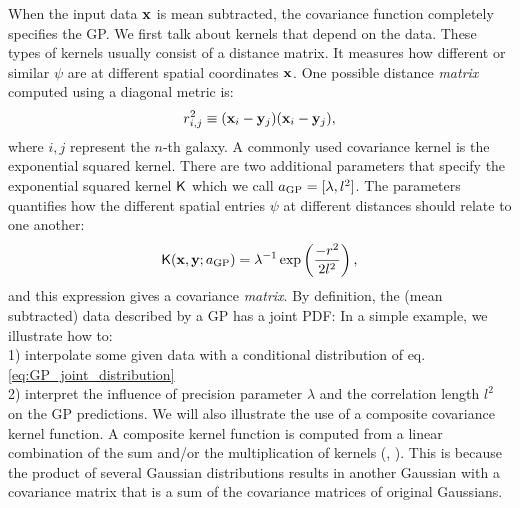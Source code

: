 When the input data $\mathbf{x}$ is mean subtracted, the covariance function  
completely specifies the GP. 
We first talk about kernels that depend on the data. These types of kernels 
usually consist of a distance matrix. It measures  
how different or similar $\psi$ are at different spatial coordinates $\mathbf{x}$. 
One possible distance {\it matrix} computed using a diagonal metric is: 
\begin{equation}
	r_{i, j}^2 \equiv (\mathbf{x}_i - \mathbf{y}_j) (\mathbf{x}_i - \mathbf{y}_j), 
	\label{eq:distance}
\end{equation}
where $i, j$ represent the $n$-th galaxy.
A commonly used covariance kernel is the exponential squared kernel. There are two
additional parameters that specify the exponential squared kernel $\mathsf{K}$ 
which we call $a_{\rm GP} = [\lambda, l^2]$. The parameters quantifies how the
different spatial entries $\psi$ at different distances should relate to one another: 
\begin{equation}
	\mathsf{K}(\mathbf{x}, \mathbf{y};a_{\rm GP}) = \lambda^{-1} \exp\left(\frac{-r^2}{2 l^2}\right),
	\label{eqn:exp_sq_kernel}
\end{equation}
and this expression gives a covariance {\it matrix}. By definition, the (mean
subtracted) data described by a  GP has a joint PDF: 
In a simple example, we illustrate how to: \\
1) interpolate some given data with a conditional distribution of
eq. \ref{eq:GP_joint_distribution}
\\
2) interpret the influence of precision parameter $\lambda$ and the correlation
length $l^2$ on the GP predictions. 
We will also illustrate the use of a composite covariance kernel function.
A composite kernel function is computed from a linear combination of the sum and/or the
multiplication of kernels (\citealt{Duvenaud2013}, \citealt{Rasmussen2006}).  
This is because the product of several Gaussian distributions results in another
Gaussian with a covariance matrix that is a sum of the covariance matrices of
original Gaussians.  


